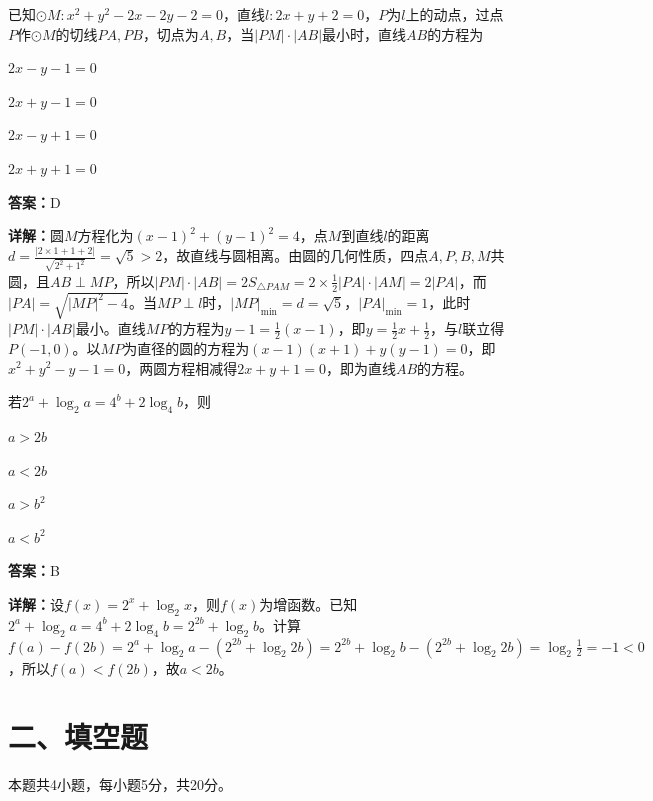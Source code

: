\begin{question}[points=5]
已知$\odot M:x^2+y^2-2x-2y-2=0$，直线$l:2x+y+2=0$，$P$为$l$上的动点，过点$P$作$\odot M$的切线$PA,PB$，切点为$A,B$，当$|PM|\cdot|AB|$最小时，直线$AB$的方程为
\begin{choices}
  \item $2x-y-1=0$
  \item $2x+y-1=0$
  \item $2x-y+1=0$
  \item $2x+y+1=0$
\end{choices}
\begin{solution}
\textbf{答案：}D

\textbf{详解：}圆$M$方程化为$(x-1)^2+(y-1)^2=4$，点$M$到直线$l$的距离$d=\frac{|2\times1+1+2|}{\sqrt{2^2+1^2}}=\sqrt{5}>2$，故直线与圆相离。由圆的几何性质，四点$A,P,B,M$共圆，且$AB\perp MP$，所以$|PM|\cdot|AB|=2S_{\triangle PAM}=2\times\frac{1}{2}|PA|\cdot|AM|=2|PA|$，而$|PA|=\sqrt{|MP|^2-4}$。当$MP\perp l$时，$|MP|_{\min}=d=\sqrt{5}$，$|PA|_{\min}=1$，此时$|PM|\cdot|AB|$最小。直线$MP$的方程为$y-1=\frac{1}{2}(x-1)$，即$y=\frac{1}{2}x+\frac{1}{2}$，与$l$联立得$P(-1,0)$。以$MP$为直径的圆的方程为$(x-1)(x+1)+y(y-1)=0$，即$x^2+y^2-y-1=0$，两圆方程相减得$2x+y+1=0$，即为直线$AB$的方程。
\end{solution}
\end{question}

\begin{question}[points=5]
若$2^a+\log_2 a=4^b+2\log_4 b$，则
\begin{choices}
  \item $a>2b$
  \item $a<2b$
  \item $a>b^2$
  \item $a<b^2$
\end{choices}
\begin{solution}
\textbf{答案：}B

\textbf{详解：}设$f(x)=2^x+\log_2 x$，则$f(x)$为增函数。已知$2^a+\log_2 a=4^b+2\log_4 b=2^{2b}+\log_2 b$。计算$f(a)-f(2b)=2^a+\log_2 a-(2^{2b}+\log_2 2b)=2^{2b}+\log_2 b-(2^{2b}+\log_2 2b)=\log_2\frac{1}{2}=-1<0$，所以$f(a)<f(2b)$，故$a<2b$。
\end{solution}
\end{question}

\section*{二、填空题}
本题共4小题，每小题5分，共20分。

